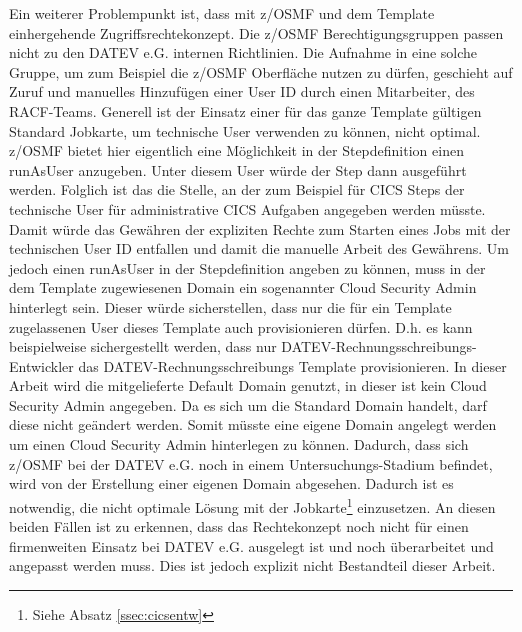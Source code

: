 Ein weiterer Problempunkt ist, dass mit z/OSMF und dem Template einhergehende Zugriffsrechtekonzept.
Die z/OSMF Berechtigungsgruppen passen nicht zu den DATEV e.G. internen Richtlinien.
Die Aufnahme in eine solche Gruppe, um zum Beispiel die z/OSMF Oberfläche nutzen zu dürfen, geschieht auf Zuruf und manuelles Hinzufügen einer User ID durch einen Mitarbeiter, des RACF-Teams.
Generell ist der Einsatz einer für das ganze Template gültigen Standard Jobkarte, um technische User verwenden zu können, nicht optimal.
z/OSMF bietet hier eigentlich eine Möglichkeit in der Stepdefinition einen \glqq runAsUser\grqq{} anzugeben.
Unter diesem User würde der Step dann ausgeführt werden.
Folglich ist das die Stelle, an der zum Beispiel für CICS Steps der technische User für administrative CICS Aufgaben angegeben werden müsste.
Damit würde das Gewähren der expliziten Rechte zum Starten eines Jobs mit der technischen User ID entfallen und damit die manuelle Arbeit des \glqq Gewährens\grqq.
Um jedoch  einen \glqq runAsUser\grqq{} in der Stepdefinition angeben zu können, muss in der dem Template zugewiesenen Domain ein sogenannter \glqq Cloud Security Admin\grqq{} hinterlegt sein.
Dieser würde sicherstellen, dass nur die für ein Template zugelassenen User dieses Template auch provisionieren dürfen.
D.h. es kann beispielweise sichergestellt werden, dass nur DATEV-Rechnungsschreibungs-Entwickler das DATEV-Rechnungsschreibungs Template provisionieren.
In dieser Arbeit wird die mitgelieferte \glqq Default Domain\grqq{} genutzt, in dieser ist kein \glqq Cloud Security Admin\grqq{} angegeben.
Da es sich um die Standard Domain handelt, darf diese nicht geändert werden.
Somit müsste eine eigene Domain angelegt werden um einen Cloud Security Admin  hinterlegen zu können.
Dadurch, dass sich z/OSMF bei der DATEV e.G. noch in einem Untersuchungs-Stadium  befindet, wird von der Erstellung einer eigenen Domain abgesehen.
Dadurch ist es notwendig, die nicht optimale Lösung mit der Jobkarte\footnote{Siehe Absatz \ref{ssec:cicsentw}} einzusetzen.
An diesen beiden Fällen ist zu erkennen, dass das Rechtekonzept noch nicht für einen firmenweiten Einsatz bei DATEV e.G. ausgelegt ist und noch überarbeitet und angepasst werden muss.
Dies ist jedoch explizit nicht Bestandteil dieser Arbeit.


 
